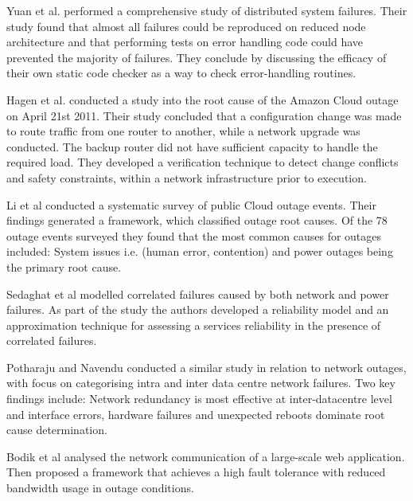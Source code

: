 \documentclass[5p]{elsarticle}
\begin{document}
Yuan et al. \cite{yuan2014simple} performed a comprehensive study of distributed system failures. Their study found that almost all failures could be reproduced on reduced node architecture and that performing tests on error handling code could have prevented the majority of failures. They conclude by discussing the efficacy of their own static code checker as a way to check error-handling routines. \par

Hagen et al. \cite{hagen2012efficient} conducted a study into the root cause of the Amazon Cloud outage on April 21st 2011. Their study concluded that a configuration change was made to route traffic from one router to another, while a network upgrade was conducted. The backup router did not have sufficient capacity to handle the required load. They developed a verification technique to detect change conflicts and safety constraints, within a network infrastructure prior to execution. \par

Li et al \cite{li2013Cloud} conducted a systematic survey of public Cloud outage events. Their findings generated a  framework, which classified outage root causes. Of the 78 outage events surveyed they found that the most common causes for outages included: System issues i.e. (human error, contention) and power outages being the primary root cause. \par

Sedaghat et al \cite{sedaghat2015hard} modelled correlated failures caused by both network and power failures. As part of the study the authors developed a reliability model and an approximation technique for assessing a services reliability in the presence of correlated failures. \par 

Potharaju and Navendu \cite{potharaju2013network} conducted a similar study in relation to network outages, with focus on categorising intra and inter data centre network failures. Two key findings include: Network redundancy is most effective at inter-datacentre level and interface errors, hardware failures and unexpected reboots dominate root cause determination. \par

Bodik et al \cite{bodik2012surviving} analysed the network communication of a large-scale web application. Then proposed a framework that achieves a high fault tolerance with reduced bandwidth usage in outage conditions. \par 
\end{document}
